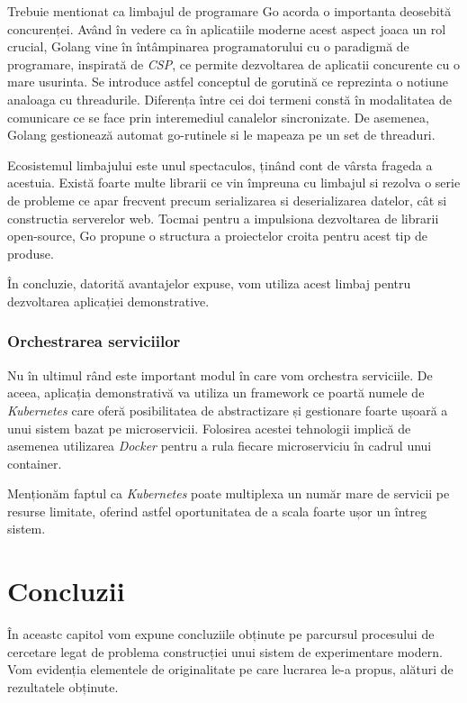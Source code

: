 Trebuie mentionat ca limbajul de programare Go acorda o importanta deosebită concurenței. Având în vedere ca în aplicatiile moderne acest aspect joaca un rol crucial,
Golang vine în întâmpinarea programatorului cu o paradigmă de programare, inspirată de \textit{CSP}\cite{hoare_csp}, ce permite
dezvoltarea de aplicatii concurente cu o mare usurinta. Se introduce astfel conceptul de gorutină
ce reprezinta o notiune analoaga cu threadurile. Diferența între cei doi termeni constă în modalitatea de comunicare ce se face prin interemediul canalelor sincronizate. De asemenea, Golang gestionează automat go-rutinele si le mapeaza pe un set de threaduri.

Ecosistemul limbajului este unul spectaculos, ținând cont de vârsta frageda a acestuia. Există foarte multe librarii ce vin împreuna cu limbajul si rezolva o serie de probleme
ce apar frecvent precum serializarea si deserializarea datelor, cât si constructia serverelor web. Tocmai pentru a impulsiona dezvoltarea de librarii open-source, Go propune o structura a proiectelor croita pentru acest tip de produse.

În concluzie, datorită avantajelor expuse, vom utiliza acest limbaj pentru dezvoltarea aplicației demonstrative.

\subsection{Orchestrarea serviciilor}

Nu în ultimul rând este important modul în care vom orchestra serviciile. De aceea, aplicația demonstrativă va utiliza un framework ce poartă numele de \textit{Kubernetes} care oferă posibilitatea de abstractizare și gestionare foarte ușoară a unui sistem bazat pe microservicii. Folosirea acestei tehnologii implică de asemenea utilizarea \textit{Docker} pentru a rula fiecare microserviciu în cadrul unui container. 

Menționăm faptul ca \textit{Kubernetes} poate multiplexa un număr mare de servicii pe resurse limitate, oferind astfel oportunitatea de a scala foarte ușor un întreg sistem.

\chapter{Concluzii}

În aceastc capitol vom expune concluziile obținute pe parcursul procesului de cercetare legat de problema construcției unui sistem de experimentare modern. Vom evidenția elementele de originalitate pe care lucrarea le-a propus, alături de rezultatele obținute. 

